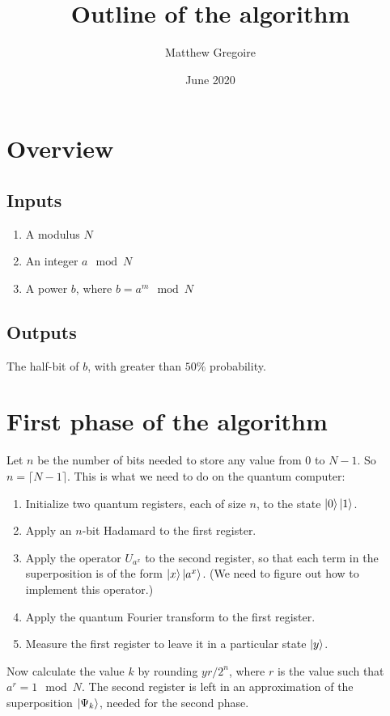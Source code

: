\documentclass{article}
\title{Outline of the algorithm}
\author{Matthew Gregoire}
\date{June 2020}
\begin{document}
\maketitle

\section{Overview}

\subsection{Inputs}
\begin{enumerate}
    \item A modulus $N$
    \item An integer $a \mod N$
    \item A power $b$, where $b = a^m \mod N$
\end{enumerate}

\subsection{Outputs}
The half-bit of $b$, with greater than $50\%$ probability.

\section{First phase of the algorithm}

Let $n$ be the number of bits needed to store any value from $0$ to $N-1$. So $n = \lceil N-1 \rceil$. This is what we need to do on the quantum computer:

\begin{enumerate}
    \item Initialize two quantum registers, each of size $n$, to the state $\ket{0}\ket{1}$.
    \item Apply an $n$-bit Hadamard to the first register.
    \item Apply the operator $U_{a^x}$ to the second register, so that each term in the superposition is of the form $\ket{x}\ket{a^x}$. (We need to figure out how to implement this operator.)
    \item Apply the quantum Fourier transform to the first register.
    \item Measure the first register to leave it in a particular state $\ket{y}$.
\end{enumerate}

Now calculate the value $k$ by rounding $yr/{2^n}$, where $r$ is the value such that $a^r = 1 \mod N$. The second register is left in an approximation of the superposition $\ket{\Psi_k}$, needed for the second phase.
\end{document}
